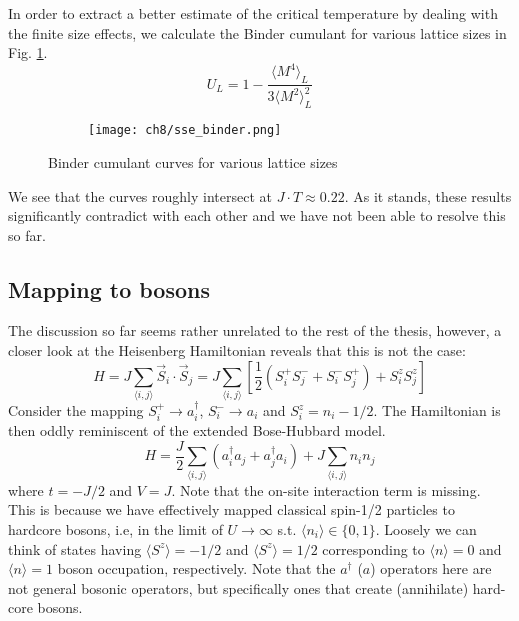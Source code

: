 In order to extract a better estimate of the critical temperature by dealing with the finite size effects, we calculate the Binder cumulant for various lattice sizes in Fig. \ref{fig:sse_bc}. 
\begin{equation}
    U_L = 1 - \frac{\langle M^4 \rangle_L}{3\langle M^2 \rangle^2_L}
\end{equation}

\begin{figure}[!htb]
    \centering
    \begin{subfigure}[b]{\textwidth}  %
        \centering
        \texttt{[image: ch8/sse\_binder.png]}
    \end{subfigure}
    \caption{Binder cumulant curves for various lattice sizes}
    \label{fig:sse_bc}
\end{figure}
\FloatBarrier \!\!\!\!\!\!\!\!\!\!\!

\vspace{-0.3cm}
We see that the curves roughly intersect at $J\cdot T \approx 0.22$. As it stands, these results significantly contradict with each other and we have not been able to resolve this so far. 

\subsection{Mapping to bosons}
The discussion so far seems rather unrelated to the rest of the thesis, however, a closer look at the Heisenberg Hamiltonian reveals that this is not the case:
\begin{equation}
    H = J\sum_{\langle i, j \rangle} \vec{S}_i \cdot \vec{S}_j = J\sum_{\langle i, j \rangle} \left [\frac{1}{2}(S_i^+ S_j^- + S_i^- S_j^+) +  S_i^z S_j^z \right ]
\end{equation}
Consider the mapping $S^+_i \to a_i^{\dagger}$, $S_i^- \to a_i$ and $S^z_i = n_i - 1/2$. The Hamiltonian is then oddly reminiscent of the extended Bose-Hubbard model.
\begin{equation}
    H = \frac{J}{2} \sum_{\langle i, j \rangle}(a_i^{\dagger}a_j + a_j^{\dagger}a_i) + J \sum_{\langle i, j \rangle} n_i n_j
\end{equation}
where $t = -J/2$ and $V = J$. Note that the on-site interaction term is missing. This is because we have effectively mapped classical spin-1/2 particles to hardcore bosons, i.e, in the limit of $U \to \infty$ s.t. $\langle n_i \rangle \in \{0, 1\}$. Loosely we can think of states having $\langle S^z \rangle = -1/2$ and $\langle S^z \rangle = 1/2$ corresponding to $\langle n \rangle = 0$ and $\langle n \rangle = 1$ boson occupation, respectively. Note that the $a^{\dagger}$ ($a$) operators here are not general bosonic operators, but specifically ones that create (annihilate) hard-core bosons.

